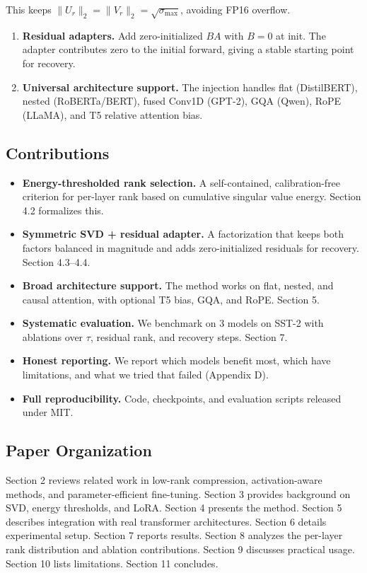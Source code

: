 This keeps $\|U_r\|_2 = \|V_r\|_2 = \sqrt{\sigma_\text{max}}$, avoiding FP16 overflow.

\begin{enumerate}
\item \textbf{Residual adapters.} Add zero-initialized $B A$ with $B = 0$ at init. The
  adapter contributes zero to the initial forward, giving a stable starting
  point for recovery.

\item \textbf{Universal architecture support.} The injection handles flat (DistilBERT),
  nested (RoBERTa/BERT), fused Conv1D (GPT-2), GQA (Qwen), RoPE (LLaMA),
  and T5 relative attention bias.

\end{enumerate}
\subsection{Contributions}

\begin{itemize}
\item \textbf{Energy-thresholded rank selection.} A self-contained, calibration-free
  criterion for per-layer rank based on cumulative singular value energy.
  Section 4.2 formalizes this.
\item \textbf{Symmetric SVD + residual adapter.} A factorization that keeps both
  factors balanced in magnitude and adds zero-initialized residuals for
  recovery. Section 4.3--4.4.
\item \textbf{Broad architecture support.} The method works on flat, nested, and causal
  attention, with optional T5 bias, GQA, and RoPE. Section 5.
\item \textbf{Systematic evaluation.} We benchmark on 3 models on SST-2 with ablations
  over $\tau$, residual rank, and recovery steps. Section 7.
\item \textbf{Honest reporting.} We report which models benefit most, which have
  limitations, and what we tried that failed (Appendix D).
\item \textbf{Full reproducibility.} Code, checkpoints, and evaluation scripts released
  under MIT.

\end{itemize}
\subsection{Paper Organization}

Section 2 reviews related work in low-rank compression, activation-aware 
methods, and parameter-efficient fine-tuning. Section 3 provides background 
on SVD, energy thresholds, and LoRA. Section 4 presents the method. Section 5 
describes integration with real transformer architectures. Section 6 details 
experimental setup. Section 7 reports results. Section 8 analyzes the 
per-layer rank distribution and ablation contributions. Section 9 discusses 
practical usage. Section 10 lists limitations. Section 11 concludes.



